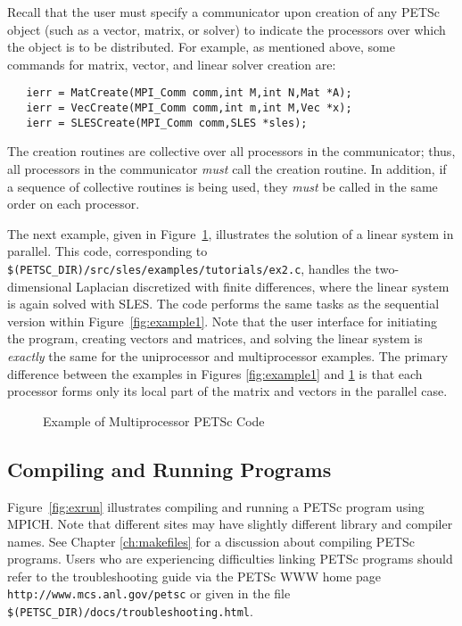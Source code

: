 Recall that the user must specify a communicator upon creation of any
PETSc object (such as a vector, matrix, or solver) to indicate the
processors over which the object is to be distributed.  For example,
as mentioned above, some commands for matrix, vector, and linear solver
creation are:
\begin{verbatim}
   ierr = MatCreate(MPI_Comm comm,int M,int N,Mat *A);
   ierr = VecCreate(MPI_Comm comm,int m,int M,Vec *x);
   ierr = SLESCreate(MPI_Comm comm,SLES *sles); 
\end{verbatim}
The creation routines are collective over all processors in the
communicator; thus, all processors in the communicator {\em must}
call the creation routine.  In addition, if a sequence of
collective routines is being used, they {\em must} be called
in the same order on each processor.

The next example, given in Figure~\ref{fig:example2}, illustrates the
solution of a linear system in parallel.  This code, corresponding to
{\tt \$(PETSC\_DIR)/src/sles/examples/tutorials/ex2.c}, handles the
two-dimensional Laplacian discretized with finite differences, where
the linear system is again solved with SLES.  The code performs the
same tasks as the sequential version within Figure~\ref{fig:example1}.
Note that the user interface for initiating the program, creating
vectors and matrices, and solving the linear system is {\em exactly}
the same for the uniprocessor and multiprocessor examples.  The
primary difference between the examples in Figures \ref{fig:example1}
and \ref{fig:example2} is that each processor forms only its local
part of the matrix and vectors in the parallel case.

\begin{figure}[H]
{\footnotesize
{}
}
\nobreak
\caption{Example of Multiprocessor PETSc Code}
\label{fig:example2}
\end{figure}

\subsection*{Compiling and Running Programs}

Figure~\ref{fig:exrun} illustrates compiling and running a PETSc program
using MPICH.  Note that different sites may have slightly different
library and compiler names.  See Chapter \ref{ch:makefiles}
for a discussion about compiling PETSc programs.
Users who are experiencing difficulties linking PETSc programs should 
refer to the troubleshooting guide via the PETSc WWW home page 
{\tt http://www.mcs.anl.gov/petsc} or
given in the file {\tt \$(PETSC\_DIR)/docs/troubleshooting.html}.

